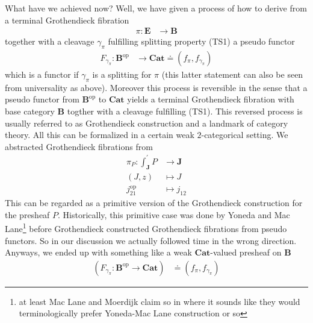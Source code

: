 What have we achieved now? Well, we have given a process of how to derive from a terminal Grothendieck fibration
\begin{align*}
  \pi
  \colon
  \mathbf{E}
  &\rightarrow
  \mathbf{B}
\end{align*}
together with a cleavage $\gamma_{\pi}$ fulfilling splitting property (TS1) a pseudo functor
\begin{align*}
  F_{\gamma_{\pi}}
  \colon
  \mathbf{B}^{\mathrm{op}}
  &\rightarrow
  \mathbf{Cat}
  \doteq
  \left(
    f_{\pi},
    f_{\gamma_{\pi}}
  \right)
\end{align*}
which is a functor if $\gamma_{\pi}$ is a splitting for $\pi$ (this latter statement can also be seen from universality as above). Moreover this process is reversible in the sense that a pseudo functor from $\mathbf{B}^{\mathrm{op}}$ to $\mathbf{Cat}$ yields a terminal Grothendieck fibration with base category $\mathbf{B}$ togther with a cleavage fulfilling (TS1). This reversed process is usually referred to as {\glqq}Grothendieck construction{\grqq} and a landmark of category theory. All this can be formalized in a certain weak $2$-categorical setting. We abstracted Grothendieck fibrations from
\begin{align*}
  \pi_{P}
  \colon
  \int_{\mathbf{J}}^{\prime}
  P
  &\rightarrow
  \mathbf{J}
  \\
  (J,z)
  &\mapsto
  J
  \\
  j_{21}^{\mathrm{op}}
  &\mapsto
  j_{12}
\end{align*}
This can be regarded as a primitive version of the Grothendieck construction for the presheaf $P$. Historically, this primitive case was done by Yoneda and Mac Lane\footnote{at least Mac Lane and Moerdijk claim so in \cite{c55c71e8} where it sounds like they would terminologically prefer Yoneda-Mac Lane construction or so} before Grothendieck constructed Grothendieck fibrations from pseudo functors. So in our discussion we actually followed time in the wrong direction. Anyways, we ended up with something like a weak $\mathbf{Cat}$-valued presheaf on $\mathbf{B}$
\begin{align*}
  \left(
    F_{\gamma_{\pi}}
    \colon
    \mathbf{B}^{\mathrm{op}}
    \rightarrow
    \mathbf{Cat}
  \right)
  &\doteq
  \left(
    f_{\pi},
    f_{\gamma_{\pi}}
  \right)
\end{align*}
